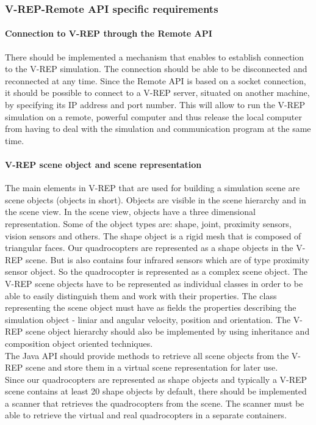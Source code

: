 \subsubsection{V-REP-Remote API specific requirements}

\paragraph{Connection to V-REP through the Remote API}

There should be implemented a mechanism that enables to establish connection to the V-REP simulation. The connection should be able to be disconnected and reconnected at any time. Since the Remote API is based on a socket connection, it should be possible to connect to a V-REP server, situated on another machine, by specifying its IP address and port number. This will allow to run the V-REP simulation on a remote, powerful computer and thus release the local computer from having to deal with the simulation and communication program at the same time.

\paragraph{V-REP scene object and scene representation}\label{sceneobject}
The main elements in V-REP that are used for building a simulation scene are scene objects (objects in short). Objects are visible in the scene hierarchy and in the scene view. In the scene view, objects have a three dimensional representation. Some of the object types are: shape, joint, proximity sensors, vision sensors and others. The shape object is a rigid mesh that is composed of triangular faces. Our quadrocopters are represented as a shape objects in the V-REP scene. But is also contains four infrared sensors which are of type proximity sensor object. So the quadrocopter is represented as a complex scene object. 
The V-REP scene objects have to be represented as individual classes in order to be able to easily distinguish them and work with their properties. The class representing the scene object must have as fields the properties describing the simulation object - liniar and angular velocity, position and orientation. The V-REP scene object hierarchy should also be implemented by using inheritance and composition object oriented techniques. \\
The Java API should provide methods to retrieve all scene objects from the V-REP scene and store them in a virtual scene representation for later use.\\
Since our quadrocopters are represented as shape objects and typically a V-REP scene contains at least 20 shape objects by default, there should be implemented a scanner that retrieves the quadrocopters from the scene. The scanner must be able to retrieve the virtual and real quadrocopters in a separate containers.

